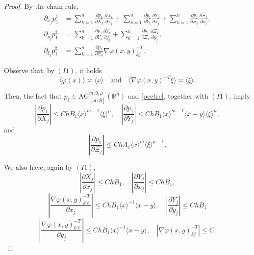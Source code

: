 \documentclass[11pt,reqno]{amsart}
\numberwithin{equation}{section}
\newcommand{\AG}{{\mathrm{AG}}}
\newcommand{\A}{{\mathcal{A}}} %
\newcommand{\B}{{\mathcal{B}}} %
\begin{document}
\begin{proof}
	By the chain rule, 
	\begin{equation}\label{dxp}
	\begin{aligned}
		\partial_{x_j}p_1^\sharp &= \sum_{k=1}^n \frac{\partial p_1}{\partial X_k}\frac{\partial X_k}{\partial x_j} + 
		\sum_{k=1}^{n}\frac{\partial p_1}{\partial Y_k}\frac{\partial Y_k}{\partial x_j} + 
		\sum_{k=1}^{n}\frac{\partial p_1}{\partial \Xi_k}\frac{\partial \Xi_k}{\partial x_j},
	\\
		\partial_{y_j}p_1^\sharp &= \sum_{k=1}^{n}\frac{\partial p_1}{\partial Y_k}\frac{\partial Y_k}{\partial y_j} + \sum_{k=1}^{n}\frac{\partial p_1}{\partial \Xi_k}\frac{\partial \Xi_k}{\partial y_j},
	\\
		\partial_{\xi_j}p_1^\sharp &= \sum_{k=1}^n \frac{\partial p_1}{\partial\Xi_k}\nabla\varphi(x,y)_{kj}^{-T}.
	\end{aligned}
	\end{equation}
	
	Observe that, by $(I1)$, it holds
	\[
		\langle\varphi(x)\rangle \asymp \langle x\rangle\quad\text{and}\quad \langle \nabla\varphi(x,y)^{-T}\xi\rangle \asymp \langle\xi\rangle.
	\]
	
	Then, the fact that $p_1\in \AG_{[\A,\B]}^{m,0,\mu}(\mathbb{R}^n)$ and \eqref{peetre}, together with $(I1)$, imply
	\begin{equation*}
		\left|\frac{\partial p_1}{\partial X_j}\right| \leq Ch B_1\langle x\rangle^{m-1}  \langle \xi\rangle^{\mu},\quad 
		\left|\frac{\partial p_1}{\partial Y_j}\right| \leq Ch B_1 \langle x\rangle^{m-1} \langle x-y\rangle \langle \xi\rangle^{\mu},
	\end{equation*}
	and
	\begin{equation*}
		\left|\frac{\partial p_1}{\partial \Xi_j}\right| \leq Ch A_1 \langle x\rangle^{m} \langle\xi\rangle^{\mu-1}.
	\end{equation*}
	
	We also have, again by $(I1)$,
	\begin{equation*}
		\left|\frac{\partial X_j}{\partial x_j}\right| \leq Ch B_1 ,\quad %
		\left|\frac{\partial Y_j}{\partial x_j}\right| \leq Ch B_1, %
	\end{equation*}
	\begin{equation*}
		\left| \frac{\nabla\varphi(x,y)_{k\ell}^{-T}}{\partial x_j}\right| \leq Ch B_1\langle x\rangle^{-1}\langle x-y\rangle,
		\quad \left|\frac{\partial Y_j}{\partial y_j}\right| \leq Ch B_1%
	\end{equation*}
	\begin{equation*}
		\left|\frac{\nabla\varphi(x,y)_{k\ell}^{-T}}{\partial y_j}\right| \leq Ch B_1\langle x\rangle^{-1}\langle x-y\rangle,\quad |\nabla\varphi(x,y)_{kj}^{-T}|\leq C.
	\end{equation*}
	

\end{proof}
\end{document}
